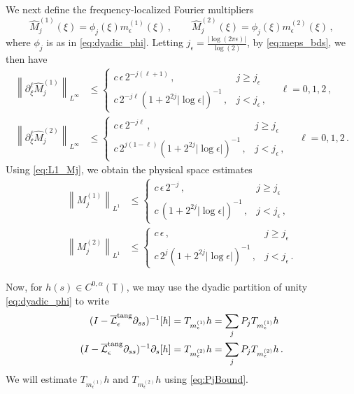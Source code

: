 \documentclass[11pt,reqno]{amsart}
\newcommand{\T}{\mathbb{T}}
\newcommand{\p}{\partial}
\newcommand{\abs}[1]{\left\lvert #1 \right\rvert}
\newcommand{\norm}[1]{\left\lVert #1 \right\rVert}
\newcommand{\wh}[1]{\widehat{#1}}
\newcommand{\mc}[1]{\mathcal{#1}}
\theoremstyle{definition}
\begin{document}
%
%
We next define the frequency-localized Fourier multipliers 
\begin{equation}
  \wh{M}_j^{(1)}(\xi)= \phi_j(\xi)m^{(1)}_\epsilon(\xi) \,, \qquad
  \wh{M}_j^{(2)}(\xi)= \phi_j(\xi)m^{(2)}_\epsilon(\xi)\,,
\end{equation}
where $\phi_j$ is as in \eqref{eq:dyadic_phi}.
Letting $j_\epsilon = \frac{\abs{\log(2\pi\epsilon)}}{\log(2)}$, by \eqref{eq:meps_bds}, we then have 
\begin{equation}
\begin{aligned}
  \norm{\p_\xi^\ell \wh{M}_j^{(1)}}_{L^\infty} &\le \begin{cases}
    c\,\epsilon \,2^{-j(\ell+1)}\,, & j\ge j_\epsilon\\
    c\,2^{-j\ell}(1+2^{2j}\abs{\log\epsilon})^{-1}\,, & j<j_\epsilon\,,
  \end{cases} 
  \quad \ell=0,1,2\,, \\
  \norm{\p_\xi^\ell \wh{M}_j^{(2)}}_{L^\infty} &\le \begin{cases}
    c\,\epsilon \,2^{-j\ell}\,, & j\ge j_\epsilon\\
    c\,2^{j(1-\ell)}(1+2^{2j}\abs{\log\epsilon})^{-1}\,, & j<j_\epsilon\,,
  \end{cases}
  \quad \ell=0,1,2\,.
\end{aligned}
\end{equation}
%
%
Using \eqref{eq:L1_Mj}, we obtain the physical space estimates
\begin{equation}\label{eq:phys_ests}
\begin{aligned}
  \norm{M_j^{(1)}}_{L^1} &\le \begin{cases}
    c\,\epsilon\,2^{-j}\,, & j\ge j_\epsilon\\
    c\,(1+2^{2j}\abs{\log\epsilon})^{-1} \,, & j<j_\epsilon\,,
  \end{cases}\\
  \norm{M_j^{(2)}}_{L^1} &\le \begin{cases}
    c\,\epsilon \,, & j\ge j_\epsilon\\
    c\,2^j(1+2^{2j}\abs{\log\epsilon})^{-1}\,, & j<j_\epsilon\,.
  \end{cases}
\end{aligned}
\end{equation}


Now, for $h(s)\in C^{0,\alpha}(\T)$, we may use the dyadic partition of unity \eqref{eq:dyadic_phi} to write
\begin{equation}
\begin{aligned}
  (I-\overline{\mc{L}}_\epsilon^{\rm tang}\p_{ss})^{-1}[h] &= T_{m^{(1)}_\epsilon}h = \sum_jP_jT_{m^{(1)}_\epsilon}h\\
  (I-\overline{\mc{L}}_\epsilon^{\rm tang}\p_{ss})^{-1}\p_s[h] &= T_{m^{(2)}_\epsilon}h = \sum_jP_jT_{m^{(2)}_\epsilon}h\,.
\end{aligned}
\end{equation}
%
%
We will estimate $T_{m^{(1)}_\epsilon}h$ and $T_{m^{(2)}_\epsilon}h$ using \eqref{eq:PjBound}.
\end{document}
